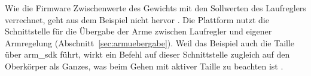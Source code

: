 Wie die Firmware Zwischenwerte des Gewichts mit den Sollwerten des Laufreglers verrechnet, geht aus dem Beispiel nicht hervor .
Die Plattform nutzt die Schnittstelle für die Übergabe der Arme zwischen Laufregler und eigener Armregelung (Abschnitt~\ref{sec:armuebergabe}).
Weil das Beispiel auch die Taille über arm\_sdk führt, wirkt ein Befehl auf dieser Schnittstelle zugleich auf den Oberkörper als Ganzes, was beim Gehen mit aktiver Taille zu beachten ist .
